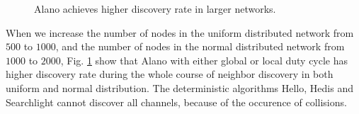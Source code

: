 \begin{figure}[!h]

\hspace{0.01in}
\hspace{0.01in}
\hspace{0.01in}
\caption{Alano achieves higher discovery rate in larger networks.}
\label{fig_timerate_large}
\end{figure}



When we increase the number of nodes in the uniform distributed  network from $500$ to $1000$, and the number of nodes in the normal distributed network from $1000$ to $2000$, Fig. \ref{fig_timerate_large} show that Alano with either global or local duty cycle has higher discovery rate during the whole course of neighbor discovery in both uniform and normal distribution. The deterministic algorithms Hello, Hedis and Searchlight cannot discover all channels, because of the occurence of collisions. 






